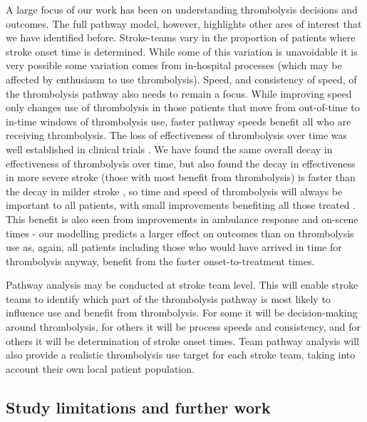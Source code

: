 A large focus of our work has been on understanding thrombolysis decisions and outcomes. The full pathway model, however, highlights other ares of interest that we have identified before. Stroke-teams vary in the proportion of patients where stroke onset time is determined. While some of this variation is unavoidable it is very possible some variation comes from in-hospital processes (which may be affected by enthusiasm to use thrombolysis). Speed, and consistency of speed, of the thrombolysis pathway also needs to remain a focus. While improving speed only changes use of thrombolysis in those patients that move from out-of-time to in-time windows of thrombolysis use, faster pathway speeds benefit all who are receiving thrombolysis. The loss of effectiveness of thrombolysis over time was well established in clinical trials \cite{emberson_effect_2014}. We have found the same overall decay in effectiveness of thrombolysis over time, but also found the decay in effectiveness in more severe stroke (those with most benefit from thrombolysis) is faster than the decay in milder stroke \cite{pearn_thrombolysis_2024}, so time and speed of thrombolysis will always be important to all patients, with small improvements benefiting all those treated \cite{meretoja_stroke_2014}. This benefit is also seen from improvements in ambulance response and on-scene times - our modelling predicts a larger effect on outcomes than on thrombolysis use as, again, all patients including those who would have arrived in time for thrombolysis anyway, benefit from the faster onset-to-treatment times. 

Pathway analysis may be conducted at stroke team level. This will enable stroke teams to identify which part of the thrombolysis pathway is most likely to influence use and benefit from thrombolysis. For some it will be decision-making around thrombolysis, for others it will be process speeds and consistency, and for others it will be determination of stroke onset times. Team pathway analysis will also provide a realistic thrombolysis use target for each stroke team, taking into account their own local patient population.

\subsection{Study limitations and further work}

